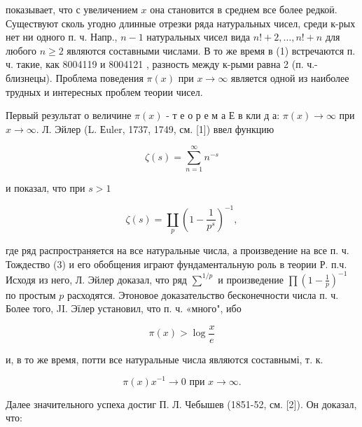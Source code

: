 \documentclass[10pt]{article}
\begin{document}
показывает, что с увеличением $x$ она становится в среднем все более редкоӥ. Существуют сколь угодно длинные отрезки ряда натуральных чисел, среди к-рых нет ни одного п. ч. Напр., $n-1$ натуральных чисел вида $n !+2, \ldots, n !+n$ для любого $n \geqslant 2$ являются составными числами. В то же время в (1) встречаются п. ч. такие, как 8004119 и 8004121 , разность между к-рыми равна 2 (п. ч.- близнецы). Проблема поведения $\pi(x)$ при $x \rightarrow \infty$ является одной из наиболее трудных и интересных проблем теории чисел.



Первый результат о величине $\pi(x)$ - т е о р е м а Е в кли д а: $\pi(x) \rightarrow \infty$ при $x \rightarrow \infty$. Л. Эйлер (L. Еuler, 1737, 1749, см. [1]) ввел функцию



\[

\zeta(s)=\sum_{n=1}^{\infty} n^{-s}

\]



и показал, что при $s>1$



\[

\zeta(s)=\coprod_{p}\left(1-\frac{1}{p^{s}}\right)^{-1},

\]



где ряд распространяется на все натуральные числа, а произведение на все п. ч. Тождество (3) и его обобщения играют фундаментальную роль в теории Р. п.ч. Исходя из него, Л. Эйлер доказал, что ряд $\sum^{1 / p}$ и произведение $\prod\left(1-\frac{1}{p}\right)^{-1}$ по простым $p$ расходятся. Этоновое доказательство бесконечности числа п. ч. Более того, JI. Эїлер установил, что п. ч. «много", ибо



\[

\pi(x)>\log \frac{x}{e}

\]



и, в то же время, потти все натуральные числа являются составнымі, т. к.



\[

\pi(x) x^{-1} \longrightarrow 0 \text { при } x \longrightarrow \infty .

\]



Далее значительного успеха достиг П. Л. Чебышев (1851-52, см. [2]). Он доказал, что:
\end{document}
